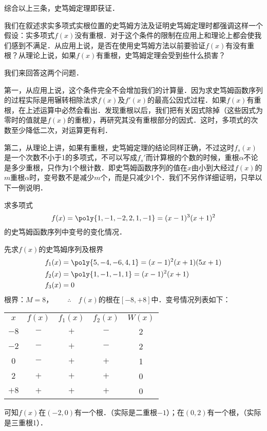 综合以上三条，史笃姆定理即获证．

我们在叙述求实多项式实根位置的史笃姆方法及证明史笃姆定理时都强调这样一个假设：实多项式$f(x)$没有重根．对于这个条件的限制在应用上和理论上都会使我们感到不满足．从应用上说，是否在使用史笃姆方法以前要验证$f(x)$有没有重根？从理论上说，如果$f(x)$有重根，史笃姆定理会受到些什么损害？

我们来回答这两个问题．

第一，从应用上说，这个条件完全不会增加我们的计算量．因为求史笃姆函数序列的过程实际是用辗转相除法求$f(x)$及$f'(x)$的最高公因式过程．如果$f(x)$有重根，在上述运算中必然会看出．发现重根以后，我们把有关因式除掉（这些因式为零时的值就是$f(x)$的重根），再研究其没有重根部分的因式．这时，多项式的次数至少降低二次，对运算更有利．

第二，从理论上讲，如果有重根，史笃姆定理的结论同样正确，不过这时$f_s(x)$是一个次数不小于1的多项式，不可以写成$f_s'$而计算根的个数的时候，重根$\alpha$不论是多少重根，只作为1个根计数．即史笃姆函数序列的值在$x$由小到大经过$f(x)$的$m$重根$\alpha$时，变号数不是减少$m$个，而是只减少1个．我们不另作详细证明，只举以下一例说明．

\begin{example}
求多项式
\[f(x)=\poly{1,-1,-2,2,1,-1}=(x-1)^3(x+1)^2\]
的史笃姆函数序列中变号的变化情况．
\end{example}

\begin{solution}
先求$f(x)$的史笃姆序列及根界
\[\begin{split}
    f_1(x)&=\poly{5,-4,-6,4,1}=(x-1)^2(x+1)(5x+1)\\
    f_2(x)&=\poly{1,-1,-1,1}=(x-1)^2(x+1)\\
    f_3(x)&=0
\end{split}
    \]
根界：$M=8$，$\qquad \therefore\quad f(x)$的根在$[-8,+8]$中．变号情况列表如下：
\begin{center}
    \begin{tabular}{ccccc}
$x$ & $f(x)$ & $f_1(x)$ & $f_2(x)$ &  $W(x)$\\
$-8$ & $-$ & $+$ &$-$&2\\
$-2$ &$-$ & $+$ &$-$&2\\
$0$ & $-$ & $+$ &$+$&1\\
$2$ &  $+$ & $+$ &$+$&0\\
$+8$ &  $+$ & $+$ &$+$&0\\
    \end{tabular}
\end{center}

可知$f(x)$在$(-2, 0)$有一个根．（实际是二重根$-1$）；在$(0, 2)$有一个根，（实际是三重根1）．
\end{solution}

